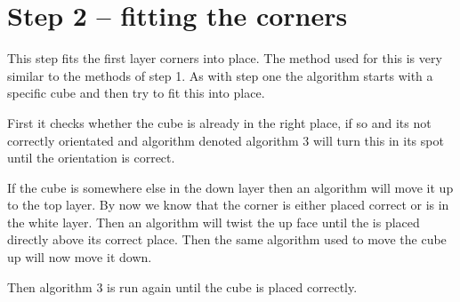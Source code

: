 \section{Step 2 -- fitting the corners}
This step fits the first layer corners into place. The method used for this is very similar to the methods of step 1. As with step one the algorithm starts with a specific cube and then try to fit this into place.  

First it checks whether the cube is already in the right place, if so and its not correctly orientated and algorithm denoted algorithm 3 will turn this \cpiece{} in its spot until the orientation is correct. 

If the cube is somewhere else in the down layer then an algorithm will move it up to the top layer. By now we know that the corner \cpiece{} is either placed correct or is in the white layer. Then an algorithm will twist the up face until the \cpiece{} is placed directly above its correct place. Then the same algorithm used to move the cube up will now move it down. 

Then algorithm 3 is run again until the cube is placed correctly.

